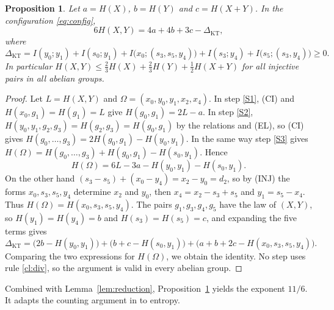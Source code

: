 \documentclass[11pt]{amsart}
\newtheorem{proposition}[theorem]{Proposition}
\theoremstyle{definition}
\theoremstyle{remark}
\numberwithin{equation}{section}
\newcommand{\KT}{\mathrm{KT}}
\begin{document}
\begin{proposition}\label{prop:kt}
Let $a=H(X)$, $b=H(Y)$ and $c=H(X+Y)$. In the configuration \eqref{eq:config},
\[
6H(X,Y)=4a+4b+3c-\Delta_\KT,
\]
where
\[
\Delta_\KT=I(y_0;y_1)+I(s_0;y_1)+I\bigl(x_0;(s_3,s_5,y_4)\bigr)+I(s_3;y_4)+I\bigl(s_5;(s_3,y_4)\bigr)\ge0.
\]
In particular $H(X,Y)\le\tfrac23H(X)+\tfrac23H(Y)+\tfrac12H(X+Y)$ for all injective pairs in all abelian groups.
\end{proposition}

\begin{proof}
Let $L=H(X,Y)$ and $\Omega=(x_0,y_0,y_1,x_2,x_4)$. In step \ref{S1}, (CI) and $H(x_0,g_1)=H(g_1)=L$ give $H(g_0,g_1)=2L-a$. In step \ref{S2}, $H(y_0,y_1,g_2,g_3)=H(g_2,g_3)=H(g_0,g_1)$ by the relations and (EL), so (CI) gives $H(g_0,\dots,g_3)=2H(g_0,g_1)-H(y_0,y_1)$. In the same way step \ref{S3} gives $H(\Omega)=H(g_0,\dots,g_3)+H(g_0,g_1)-H(s_0,y_1)$. Hence
\[
H(\Omega)=6L-3a-H(y_0,y_1)-H(s_0,y_1).
\]
On the other hand $(s_3-s_5)+(x_0-y_4)=x_2-y_0=d_2$, so by (INJ) the forms $x_0,s_3,s_5,y_4$ determine $x_2$ and $y_0$, then $x_4=x_2-s_3+s_5$ and $y_1=s_5-x_4$. Thus $H(\Omega)=H(x_0,s_3,s_5,y_4)$. The pairs $g_1,g_3,g_4,g_5$ have the law of $(X,Y)$, so $H(y_1)=H(y_4)=b$ and $H(s_3)=H(s_5)=c$, and expanding the five terms gives
\[
\Delta_\KT=\bigl(2b-H(y_0,y_1)\bigr)+\bigl(b+c-H(s_0,y_1)\bigr)+\bigl(a+b+2c-H(x_0,s_3,s_5,y_4)\bigr).
\]
Comparing the two expressions for $H(\Omega)$, we obtain the identity. No step uses rule \ref{cl:div}, so the argument is valid in every abelian group.
\end{proof}

Combined with Lemma~\ref{lem:reduction}, Proposition~\ref{prop:kt} yields the exponent $11/6$. It adapts the counting argument in \cite[\S3]{KT99} to entropy.
\end{document}
